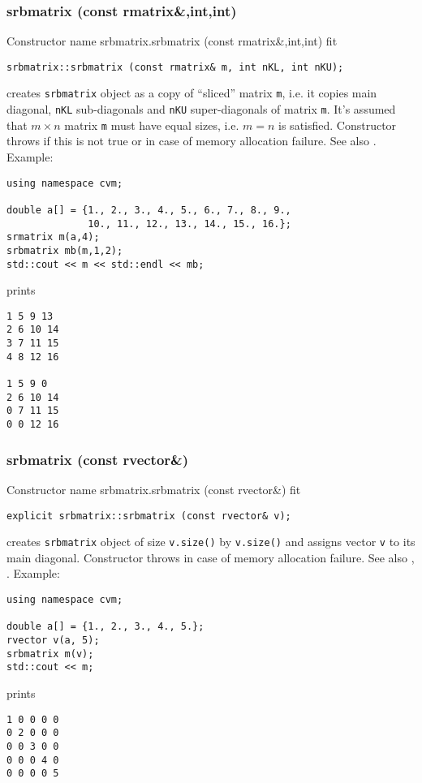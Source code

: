 \subsubsection{srbmatrix (const rmatrix\&,int,int)}
Constructor%
\pdfdest name {srbmatrix.srbmatrix (const rmatrix&,int,int)} fit
\begin{verbatim}
srbmatrix::srbmatrix (const rmatrix& m, int nKL, int nKU);
\end{verbatim}
creates  \verb"srbmatrix" object as a copy of ``sliced'' 
matrix \verb"m", i.e. it copies main diagonal, \verb"nKL" 
sub-diagonals and \verb"nKU" super-diagonals of matrix \verb"m".
It's assumed that $m\times n$ matrix \verb"m" must have equal
sizes, i.e. $m = n$ is satisfied.
Constructor throws  
if this is not true or in case of memory allocation failure.
See also .
Example:
\begin{Verbatim}
using namespace cvm;

double a[] = {1., 2., 3., 4., 5., 6., 7., 8., 9.,
              10., 11., 12., 13., 14., 15., 16.};
srmatrix m(a,4);
srbmatrix mb(m,1,2);
std::cout << m << std::endl << mb;
\end{Verbatim}
prints
\begin{Verbatim}
1 5 9 13
2 6 10 14
3 7 11 15
4 8 12 16

1 5 9 0
2 6 10 14
0 7 11 15
0 0 12 16
\end{Verbatim}
\newpage



\subsubsection{srbmatrix (const rvector\&)}
Constructor%
\pdfdest name {srbmatrix.srbmatrix (const rvector&)} fit
\begin{verbatim}
explicit srbmatrix::srbmatrix (const rvector& v);
\end{verbatim}
creates \verb"srbmatrix" object
of size \verb"v.size()" by \verb"v.size()"
and assigns vector \verb"v" to its main diagonal.
Constructor throws  
in case of memory allocation failure.
See also , .
Example:
\begin{Verbatim}
using namespace cvm;

double a[] = {1., 2., 3., 4., 5.};
rvector v(a, 5);
srbmatrix m(v);
std::cout << m;
\end{Verbatim}
prints
\begin{Verbatim}
1 0 0 0 0
0 2 0 0 0
0 0 3 0 0
0 0 0 4 0
0 0 0 0 5
\end{Verbatim}
\newpage




